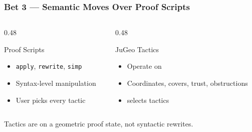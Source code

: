 \begin{frame}
\frametitle{Bet 3 --- Semantic Moves Over Proof Scripts}
\begin{columns}[T]
\begin{column}{0.48\textwidth}
\begin{alertblock}{Proof Scripts}
  \begin{itemize}
    \item \texttt{apply}, \texttt{rewrite}, \texttt{simp}
    \item Syntax-level manipulation
    \item User picks every tactic
  \end{itemize}
\end{alertblock}
\end{column}
\begin{column}{0.48\textwidth}
\begin{exampleblock}{JuGeo Tactics}
  \begin{itemize}
    \item Operate on 
    \item Coordinates, covers, trust, obstructions
    \item {} selects tactics
  \end{itemize}
\end{exampleblock}
\end{column}
\end{columns}
\vspace{10pt}
\begin{center}
\end{center}
{\small Tactics are  on a geometric proof state, not syntactic rewrites.}
\end{frame}

